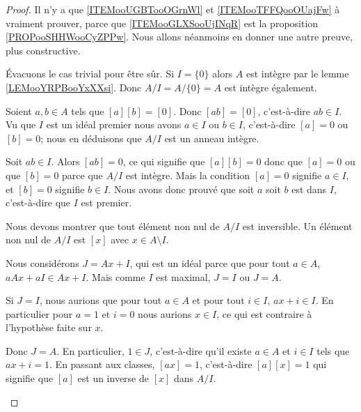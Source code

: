 \begin{proof}
    Il n'y a que \ref{ITEMooUGBTooOGrnWl} et \ref{ITEMooTFFQooOUajFw} à vraiment prouver, parce que \ref{ITEMooGLXSooUjINqR} est la proposition \ref{PROPooSHHWooCyZPPw}. Nous allons néanmoins en donner une autre preuve, plus constructive.
    \begin{subproof}
        \item[ \ref{ITEMooUGBTooOGrnWl} -- \( I\) premier implique \( A/I\) intègre]
            Évacuons le cas trivial pour être sûr. Si \( I=\{ 0 \}\) alors \( A\) est intègre par le lemme \ref{LEMooYRPBooYxXXsi}. Donc \( A/I=A/\{ 0 \}=A\) est intègre également.

            Soient \( a,b\in A\) tels que \( [a][b]=[0]\). Donc \( [ab]=[0]\), c'est-à-dire \( ab\in I\). Vu que \( I\) est un idéal premier nous avons \( a\in I\) ou \( b\in I\), c'est-à-dire \( [a]=0\) ou \( [b]=0\); nous en déduisons que \( A/I\) est un anneau intègre.

        \item[ \ref{ITEMooUGBTooOGrnWl} -- \( A/I\) intègre implique \( I\) premier]
            Soit \( ab\in I\). Alors \( [ab]=0\), ce qui signifie que \( [a][b]=0\) donc que \( [a]=0\) ou que \( [b]=0\) parce que \( A/I\) est intègre. Mais la condition \( [a]=0\) signifie \( a\in I\), et \( [b]=0\) signifie \( b\in I\). Nous avons donc prouvé que soit \( a\) soit \( b\) est dans \( I\), c'est-à-dire que \( I\) est premier.

        \item[\ref{ITEMooGLXSooUjINqR} -- \( I\) maximum implique \( A/I\) corps]

            Nous devons montrer que tout élément non nul de \( A/I\) est inversible. Un élément non nul de \( A/I\) est \( [x]\) avec \( x\in A\setminus I\). 
            
            Nous considérons \( J=Ax+I\), qui est un idéal parce que pour tout \( a\in A\), \( aAx+aI\in Ax+I\). Mais comme \( I\) est maximal, \( J=I\) ou \( J=A\).

            Si \( J=I\), nous aurions que pour tout \( a\in A\) et pour tout \( i\in I\), \( ax+i\in I\). En particulier pour \( a=1\) et \( i=0\) nous aurions \( x\in I\), ce qui est contraire à l'hypothèse faite sur \( x\).

            Donc \( J=A\). En particulier, \( 1\in J\), c'est-à-dire qu'il existe \( a\in A\) et \( i\in I\) tels que \( ax+i=1\). En passant aux classes, \( [ax]=1\), c'est-à-dire \( [a][x]=1\) qui signifie que \( [a]\) est un inverse de \( [x]\) dans \( A/I\).


\end{subproof}
\end{proof}
